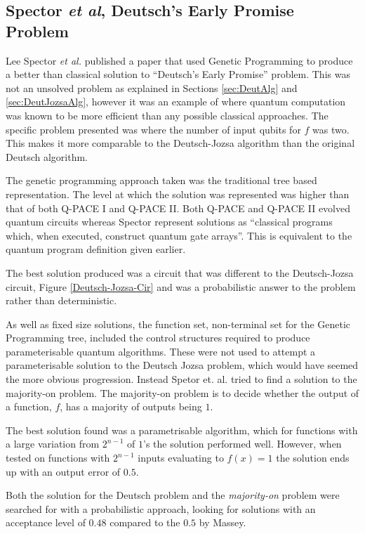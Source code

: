 \subsection{Spector \emph{et al}, Deutsch's Early Promise Problem}
\label{sec:spectordeutschmajon}
Lee Spector \emph{et al.}\cite{LSpectorGPforQC,LSpectorANDOR,Spector:1999:QCA:316573.317112} published a paper that used Genetic Programming to produce a better than classical solution to ``Deutsch's Early Promise''\cite{LSpectorGPforQC,LSpectorANDOR,Spector:1999:QCA:316573.317112} problem.
This was not an unsolved problem as explained in Sections \ref{sec:DeutAlg} and \ref{sec:DeutJozsaAlg}, however it was an example of where quantum computation was known to be more efficient than any possible classical approaches.
The specific problem presented was where the number of input qubits for $f$ was two.
This makes it more comparable to the Deutsch-Jozsa algorithm than the original Deutsch algorithm.

The genetic programming approach taken was the traditional tree based representation.
The level at which the solution was represented was higher than that of both Q-PACE I and Q-PACE II.
Both Q-PACE and Q-PACE II evolved quantum circuits whereas Spector represent solutions as ``classical programs which, when executed, construct quantum gate arrays''.
This is equivalent to the quantum program definition given earlier.

The best solution produced was a circuit that was different to the Deutsch-Jozsa circuit, Figure \ref{Deutsch-Jozsa-Cir} and was a probabilistic answer to the problem rather than deterministic.

As well as fixed size solutions, the function set, non-terminal set for the Genetic Programming tree, included the control structures required to produce parameterisable quantum algorithms.
These were not used to attempt a parameterisable solution to the Deutsch Jozsa problem, which would have seemed the more obvious progression.
Instead Spetor et. al. tried to find a solution to the majority-on problem.
The majority-on problem is to decide whether the output of a function, $f$, has a majority of outputs being $1$.

The best solution found was a parametrisable algorithm, which for functions with a large variation from $2^{n-1}$ of $1$'s the solution performed well.
However, when tested on functions with $2^{n-1}$ inputs evaluating to $f(x)=1$ the solution ends up with an output error of $0.5$.

Both the solution for the Deutsch problem and the \emph{majority-on} problem were searched for with a probabilistic approach, looking for solutions with an acceptance level of $0.48$ compared to the $0.5$ by Massey.

